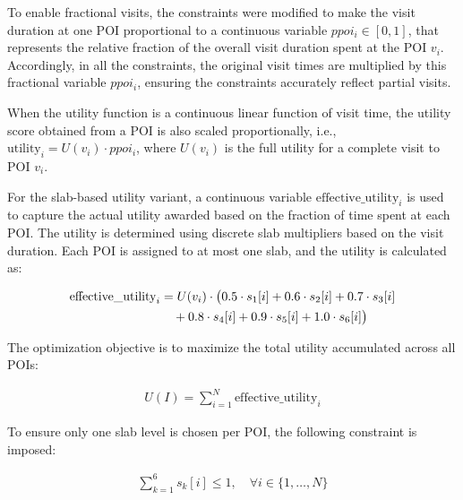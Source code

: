 To enable fractional visits, the constraints were modified to make the visit duration at one POI proportional to a continuous variable \( ppoi_i \in [0,1] \), that represents the relative fraction of the overall visit duration spent at the POI \( v_i \). Accordingly, in all the constraints, the original visit times are multiplied by this fractional variable \( ppoi_i \), ensuring the constraints accurately reflect partial visits.

When the utility function is a continuous linear function of visit time, the utility score obtained from a POI is also scaled proportionally, i.e., \( \text{utility}_i = U(v_i) \cdot ppoi_i \), where \( U(v_i) \) is the full utility for a complete visit to POI \( v_i \).

For the slab-based utility variant, a continuous variable \( \text{effective\_utility}_i \) is used to capture the actual utility awarded based on the fraction of time spent at each POI. The utility is determined using discrete slab multipliers based on the visit duration. Each POI is assigned to at most one slab, and the utility is calculated as:

\begin{align}
\label{effective_utility}
\text{effective\_utility}_i &= U(v_i) \cdot \big(0.5 \cdot s_1[i] + 0.6 \cdot s_2[i] + 0.7 \cdot s_3[i] \notag \\
&\quad + 0.8 \cdot s_4[i] + 0.9 \cdot s_5[i] + 1.0 \cdot s_6[i] \big)
\end{align}

The optimization objective is to maximize the total utility accumulated across all POIs:

\begin{align}
\label{objective_fun_slabs}
U(I) = \sum_{i=1}^N \text{effective\_utility}_i
\end{align}

To ensure only one slab level is chosen per POI, the following constraint is imposed:

\begin{align}
\sum_{k=1}^{6} s_k[i] \leq 1, \quad \forall i \in \{1, \dots, N\}
\end{align}

